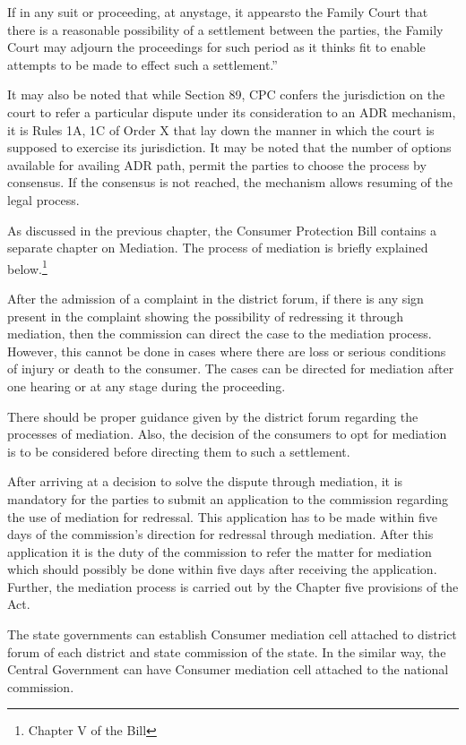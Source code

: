 \begin{multicols}{2}
\noi
If in any suit or proceeding, at anystage, it appearsto the Family Court that there is a reasonable
possibility of a settlement between the parties, the Family Court may adjourn the proceedings
for such period as it thinks fit to enable attempts to be made to effect such a settlement.”

\noi
It may also be noted that while Section 89, CPC confers the jurisdiction on the court to refer a
particular dispute under its consideration to an ADR mechanism, it is Rules 1A, 1C of Order
X that lay down the manner in which the court is supposed to exercise its jurisdiction. It may
be noted that the number of options available for availing ADR path, permit the parties to
choose the process by consensus. If the consensus is not reached, the mechanism allows
resuming of the legal process.


\noi
As discussed in the previous chapter, the Consumer Protection Bill contains a separate chapter
on Mediation. The process of mediation is briefly explained below.\footnote{Chapter V of the Bill}

\noi
After the admission of a complaint in the district forum, if there is any sign present in the
complaint showing the possibility of redressing it through mediation, then the commission can
direct the case to the mediation process. However, this cannot be done in cases where there are
loss or serious conditions of injury or death to the consumer. The cases can be directed for
mediation after one hearing or at any stage during the proceeding.

\noi
There should be proper guidance given by the district forum regarding the processes of
mediation. Also, the decision of the consumers to opt for mediation is to be considered before
directing them to such a settlement.

\noi
After arriving at a decision to solve the dispute through mediation, it is mandatory for the
parties to submit an application to the commission regarding the use of mediation for redressal.
This application has to be made within five days of the commission’s direction for redressal
through mediation. After this application it is the duty of the commission to refer the matter for
mediation which should possibly be done within five days after receiving the application.
Further, the mediation process is carried out by the Chapter five provisions of the Act.

\noi
The state governments can establish Consumer mediation cell attached to district forum of each
district and state commission of the state. In the similar way, the Central Government can have
Consumer mediation cell attached to the national commission.


\end{multicols}
